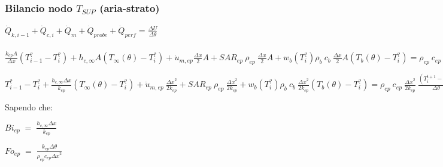 \subsubsection*{\hspace{1cm} Bilancio nodo $T_{SUP}$ (aria-strato)}

\vspace{0.3cm}

\begin{center}
	$ \Dot{Q} _{k, i-1} +\Dot{Q} _{c, i}+ \Dot{Q} _{m} +\Dot{Q} _{probe}+ \Dot{Q} _{perf}= \frac{\Delta U}{\Delta \theta} $
\end{center}

\hspace{-0.5cm}
\begin{minipage}\columnwidth
\begin{center}
	$ \frac{k_{ep}A}{\Delta x}(T_{i-1} ^? - T_i ^? ) + h_{c, \infty}A (T_{\infty} (\theta) - T_i ^? ) + \Dot{u} _{m,ep}\frac{\Delta x}{2}A + SAR_{ep} \: \rho _{ep} \: \frac{\Delta x}{2}A  + w_b (T_i^?) \rho _b \: c_b \: \frac{\Delta x}{2}A(T_b(\theta)-T_i ^?) =  \rho _{ep} \: c_{ep} \: \frac{\Delta x}{2}A \: \frac{(T_i ^{t+1} - T_i ^t )}{\Delta \theta}$
\end{center}
\end{minipage}

\hspace{-0.5cm}
\begin{minipage}\columnwidth
\begin{center}
	$ T_{i-1} ^? - T_i ^? + \frac{h_{c, \infty} \Delta x}{k_{ep}} (T_{\infty} (\theta) - T_i ^? ) + \Dot{u} _{m,ep}\:\frac{{\Delta x}^2}{2 k_{ep}} + SAR_{ep} \: \rho _{ep} \: \frac{{\Delta x}^2}{2 k_{ep}}  + w_b (T_i^?) \rho _b \: c_b \: \frac{{\Delta x}^2}{2 k_{ep}}(T_b(\theta)-T_i ^?) =  \rho _{ep} \: c_{ep} \: \frac{{\Delta x}^2}{2 k_{ep}} \: \frac{(T_i ^{t+1} - T_i ^t )}{\Delta \theta}$
\end{center}
\end{minipage}

\vspace{0.5cm}
\noindent
\hspace{2cm} Sapendo che:
\vspace{-0.3cm}

\begin{center}
    $Bi_{ep} \;=\; \frac{h_{c,\infty} \Delta x}{k_{ep}}$
\end{center}

\begin{center}
    $Fo_{ep} \;=\; \frac{k_{ep} \Delta \theta}{\rho_{ep} c_{ep} {\Delta x}^2}$
\end{center}

